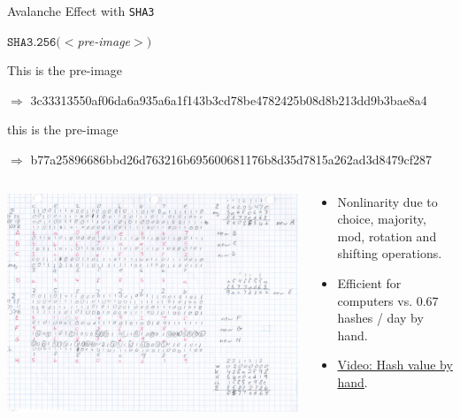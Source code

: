 \documentclass[]{beamer}
\begin{document}
\begin{frame}{Avalanche Effect with \texttt{SHA3}}

\begin{center}
$\texttt{SHA3.256}(<$\textit{pre-image}$>)$
\end{center}

This is the pre-image

$\Rightarrow$ \footnotesize 3c33313550af06da6a935a6a1f143b3cd78be4782425b08d8b213dd9b3bae8a4 \normalsize
\vspace{1em}

\color{focus}t\color{black}his is the pre-image

$\Rightarrow$ \footnotesize \color{focus}b77a25896686bbd26d763216b695600681176b8d35d7815a262ad3d8479cf287 \color{black} \normalsize
\vspace{1em}

\begin{columns}[T]
	\begin{column}{0.35\textwidth}
		\includegraphics[width = 4 cm, frame]{../assets/images/manual_hashing_video.png}
	\end{column} %
	\begin{column}{0.65\textwidth}
		\begin{itemize}
			\item Nonlinarity due to choice, majority, mod, rotation and shifting operations.
			\item Efficient for computers vs. 0.67 hashes / day by hand.
			\item \link \href{https://www.youtube.com/watch?v=y3dqhixzGVo}{Video: Hash value by hand}.
		\end{itemize}
	\end{column}
\end{columns}
	
\end{frame}
\end{document}
